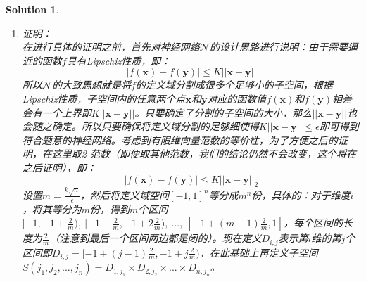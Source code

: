 \documentclass[a4paper,UTF8]{article}
\numberwithin{equation}{section}
\newtheorem*{solution}{Solution}
\begin{document}
\begin{solution}
\begin{enumerate}[ {(}1{)}]
\begin{algorithm}[h]  
	\caption{GetWeightFromIndex}  
	\begin{algorithmic}[1]  
		\Require  
		$s$ : T层的神经元编号  
		\Ensure  
		$w_s$ : 从T层到输出层的边中$\delta_s$对应的边的权重
		\State $(index_1, index_2,...,index_n) = IndexTranslate(s)$ 
		\State $xt_i = -1 + (index_i - \frac{1}{2})\frac{2}{m}$
		\EndFor
		\State $\mathbf{xt} = [xt_1, xt_2,...,xt_n] $
		\State $w_s = f(\mathbf{xt})$
		\label{code:recentEnd}  
	\end{algorithmic}  
\end{algorithm}\\
通过上述算法计算每一个$\delta_i$的权值$w_i = GetWeightFromIndex(i)$。\\
输出层的最终输出：
\begin{equation}
z = \sum_{i=1}^{m^n}w_i\delta_i
\end{equation}
\item 证明：\\
在进行具体的证明之前，首先对神经网络$\mathcal{N}$的设计思路进行说明：由于需要逼近的函数$f$具有Lipschiz性质，即：
\begin{equation}
|f(\mathbf{x}) - f(\mathbf{y})| \leq K||\mathbf{x} - \mathbf{y}||
\end{equation}
所以$\mathcal{N}$的大致思想就是将$f$的定义域分割成很多个足够小的子空间，根据Lipschiz性质，子空间内的任意两个点$\mathbf{x}$和$\mathbf{y}$对应的函数值$f(\mathbf{x})$和$f(\mathbf{y})$相差会有一个上界即$K||\mathbf{x} - \mathbf{y}||$。只要确定了分割的子空间的大小，那么$||\mathbf{x} - \mathbf{y}||$也会随之确定。所以只要确保将定义域分割的足够细使得$K||\mathbf{x} - \mathbf{y}|| \leq \epsilon$即可得到符合题意的神经网络。考虑到有限维向量范数的等价性，为了方便之后的证明，在这里取2-范数（即便取其他范数，我们的结论仍然不会改变，这个将在之后证明），即：
\begin{equation}
|f(\mathbf{x}) - f(\mathbf{y})| \leq K||\mathbf{x} - \mathbf{y}||_2
\end{equation}
设置$m=\frac{k\sqrt{n}}{\epsilon}$，然后将定义域空间$[-1,1]^n$等分成$m^n$份，具体的：对于维度$i$，将其等分为$m$份，得到$m$个区间$[-1, -1+\frac{2}{m}),\ [-1+\frac{2}{m},-1+2\frac{2}{m}),\ ...,\ [-1 + (m-1)\frac{2}{m}, 1]$，每个区间的长度为$\frac{2}{m}$（注意到最后一个区间两边都是闭的）。现在定义$D_{i,j}$表示第$i$维的第$j$个区间即$D_{i,j} = [-1+(j-1)\frac{2}{m},-1+j\frac{2}{m})$，在此基础上再定义子空间$S(j_1,j_2,...,j_n) = D_{1,j_1} \times D_{2,j_2} \times ... \times D_{n, j_n}$。\\

\end{enumerate}
\end{solution}
\end{document}
